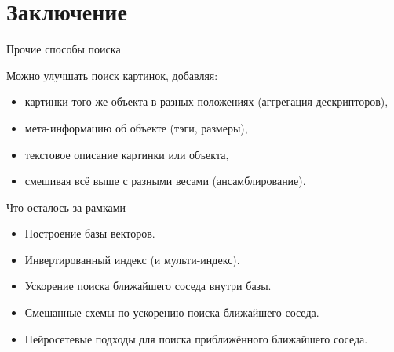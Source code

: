 \section{Заключение}

\begin{frame}{Прочие способы поиска}

Можно улучшать поиск картинок, добавляя:
\begin{itemize}
    \item картинки того же объекта в разных положениях (аггрегация дескрипторов),
    \item мета-информацию об объекте (тэги, размеры),
    \item текстовое описание картинки или объекта,
    \item смешивая всё выше с разными весами (ансамблирование).
\end{itemize}
    
\end{frame}


    

\begin{frame}{Что осталось за рамками}

\begin{itemize}
    \item Построение базы векторов.
    \item Инвертированный индекс (и мульти-индекс).
    \item Ускорение поиска ближайшего соседа внутри базы.
    \item Смешанные схемы по ускорению поиска ближайшего соседа.
    \item Нейросетевые подходы для поиска приближённого ближайшего соседа.
\end{itemize}
    
\end{frame}

